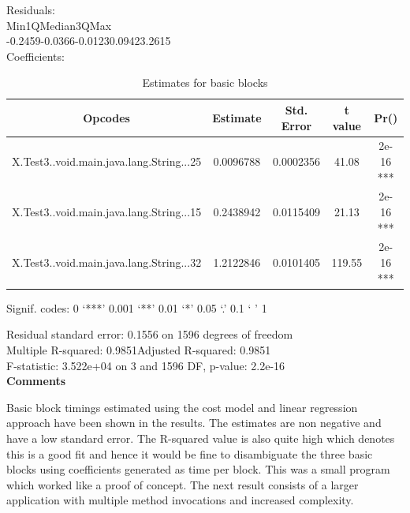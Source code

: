 \documentclass[11pt]{article}
\begin{document}
Residuals:\\
Min\hspace{4em}1Q\hspace{3em}Median\hspace{3em}3Q\hspace{3em}Max \\
-0.2459\hspace{2em}-0.0366\hspace{2em}-0.0123\hspace{2em}0.0942\hspace{2em}3.2615\\ 
Coefficients:\\
\begin{table}[h!]
\begin{center}
 \begin{tabular}{ |c|c|c|c|c| }
 \hline
 Opcodes&Estimate&Std. Error&t value&Pr()    \\
 \hline
 X.Test3..void.main.java.lang.String...25&0.0096788&0.0002356&41.08&2e-16 ***\\
 X.Test3..void.main.java.lang.String...15&0.2438942&0.0115409&21.13&2e-16 ***\\
 X.Test3..void.main.java.lang.String...32&1.2122846&0.0101405&119.55&2e-16 ***\\
 \hline
 \end{tabular}
 \end{center}
 \caption{Estimates for basic blocks}
 \label{Linear Regression results:5}
 \end{table}
 
 Signif. codes:  0 ‘***’ 0.001 ‘**’ 0.01 ‘*’ 0.05 ‘.’ 0.1 ‘ ’ 1

Residual standard error: 0.1556 on 1596 degrees of freedom\\
Multiple R-squared:  0.9851\hspace{2em}Adjusted R-squared:  0.9851 \\
F-statistic: 3.522e+04 on 3 and 1596 DF,  p-value:  2.2e-16\\

\textbf{Comments}

Basic block timings estimated using the cost model and linear regression approach have been shown in the results. The estimates are non negative and have a low standard error. The R-squared value is also quite high which denotes this is a good fit and hence it would be fine to disambiguate the three basic blocks using coefficients generated as time per block. This was a small program which worked like a proof of concept. The next result consists of a larger application with multiple method invocations and increased complexity.\\
\end{document}
